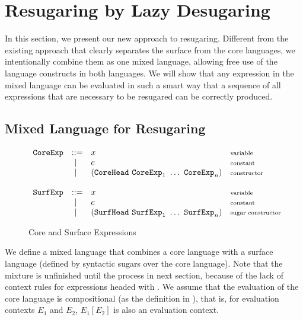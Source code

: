 
\section{Resugaring by Lazy Desugaring}
\label{sec3}

In this section, we present our new approach to resugaring. Different from the existing approach that clearly separates the surface from the core languages, we intentionally combine them as one mixed language, allowing free use of the language constructs in both languages. We will show that any expression in the mixed language can be evaluated in such a smart way that a sequence of all expressions that are necessary to be resugared can be correctly produced.

\subsection{Mixed Language for Resugaring}

\begin{figure}[t]
\begin{flushleft}
{\footnotesize
\[
\begin{array}{lllll}
\mbox{\tt CoreExp} &::=& x  & \mbox{{\scriptsize variable}}\\
&~|~& c  & \mbox{{\scriptsize constant}}\\
&~|~& (\mbox{\tt CoreHead}~\mbox{\tt CoreExp}_1~\ldots~\mbox{\tt CoreExp}_n) & \mbox{{\scriptsize constructor}}\\
\\
\mbox{\tt SurfExp} &::=& x  & \mbox{{\scriptsize variable}}\\
&~|~& c  & \mbox{{\scriptsize constant}}\\
&~|~& (\mbox{\tt SurfHead}~\mbox{\tt SurfExp}_1~\ldots~\mbox{\tt SurfExp}_n) & \mbox{{\scriptsize sugar constructor}}\\
\end{array}
\]
}
\end{flushleft}


	\caption{Core and Surface Expressions}
	\label{fig:expression}
\end{figure}

We define a mixed language that combines a core language with a surface language (defined by syntactic sugars over the core language). Note that the mixture is unfinished until the process in next section, because of the lack of context rules for expressions headed with . We assume that the evaluation of the core language is  compositional (as the definition in \cite{hygienic}), that is, for evaluation contexts $E_1$ and $E_2$, $E_1[E_2]$ is also an evaluation context.

